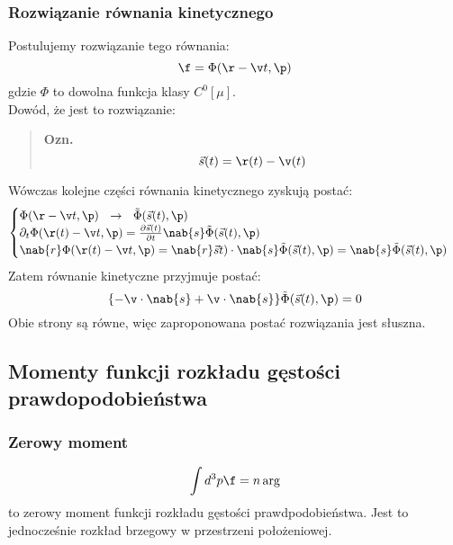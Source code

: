\subsubsection{Rozwiązanie równania kinetycznego}
Postulujemy rozwiązanie tego równania:
\begin{equation}\f=\Phi(\r-\v t,\p)\end{equation}
gdzie $\Phi$ to dowolna funkcja klasy $C^0[\mu]$.\\
Dowód, że jest to rozwiązanie:
\begin{verse}\textbf{ Ozn. }
\begin{equation} \vec{s}(t)=\r(t)-\v(t)\end{equation} \end{verse}
Wówczas kolejne części równania kinetycznego zyskują postać:
\begin{equation}\begin{cases} \Phi(\r-\v t,\p)~~\rightarrow ~~ \tilde{\Phi}(\vec{s}(t),\p) \\ 
\partial_t\Phi(\r(t)-\v t,\p)=\frac{\partial\vec{s}(t)}{\partial t}\nab{s}\tilde{\Phi}(\vec{s}(t),\p) \\ 
\nab{r}\Phi(\r(t)-\v t,\p)=\nab{r}\vec{s}t)\cdot\nab{s}\tilde{\Phi}(\vec{s}(t),\p)=\nab{s}\tilde{\Phi}(\vec{s}(t),\p) \end{cases}\end{equation}
Zatem równanie kinetyczne przyjmuje postać:
\begin{equation}\{-\v\cdot\nab{s}+\v\cdot\nab{s}\}\tilde{\Phi}(\vec{s}(t),\p)=0\end{equation}
Obie strony są równe, więc zaproponowana postać rozwiązania jest słuszna.
\subsection{Momenty funkcji rozkładu gęstości prawdopodobieństwa}
\subsubsection{Zerowy moment}
\begin{equation}\int d^3p\f=n\arg\end{equation}
to zerowy moment funkcji rozkładu gęstości prawdpodobieństwa. Jest to jednocześnie rozkład brzegowy w przestrzeni położeniowej.
